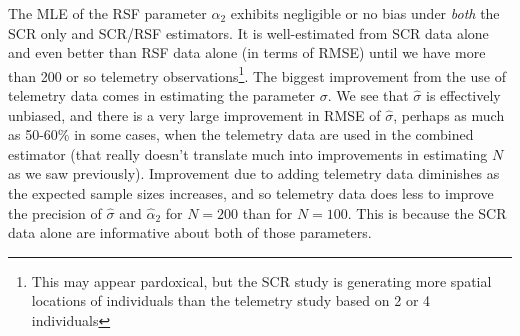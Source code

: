 \documentclass[12pt]{article}
\begin{document}
The MLE of the RSF parameter $\alpha_{2}$ exhibits negligible or no
bias under {\it both} the SCR only and SCR/RSF estimators. It is
well-estimated from SCR data alone and even better than RSF data alone
(in terms of RMSE) until we have more than 200 or so telemetry
observations\footnote{This may appear pardoxical, but the SCR study is
  generating more spatial locations of individuals than the telemetry
  study based on 2 or 4 individuals}.  The biggest improvement from the use of telemetry data
comes in estimating the parameter $\sigma$. We see that $\hat{\sigma}$
is effectively unbiased, and there is a very large improvement in RMSE
of $\hat{\sigma}$, perhaps as much as 50-60\% in some cases, when the
telemetry data are used in the combined estimator (that really doesn't
translate much into improvements in estimating $N$ as we saw
previously).  Improvement due to adding telemetry data diminishes as
the expected sample sizes increases, and so telemetry data does less
to improve the precision of $\hat{\sigma}$ and $\hat{\alpha}_{2}$ for
$N=200$ than for $N=100$. This is because the SCR data alone are
informative about both of those parameters.
\end{document}
